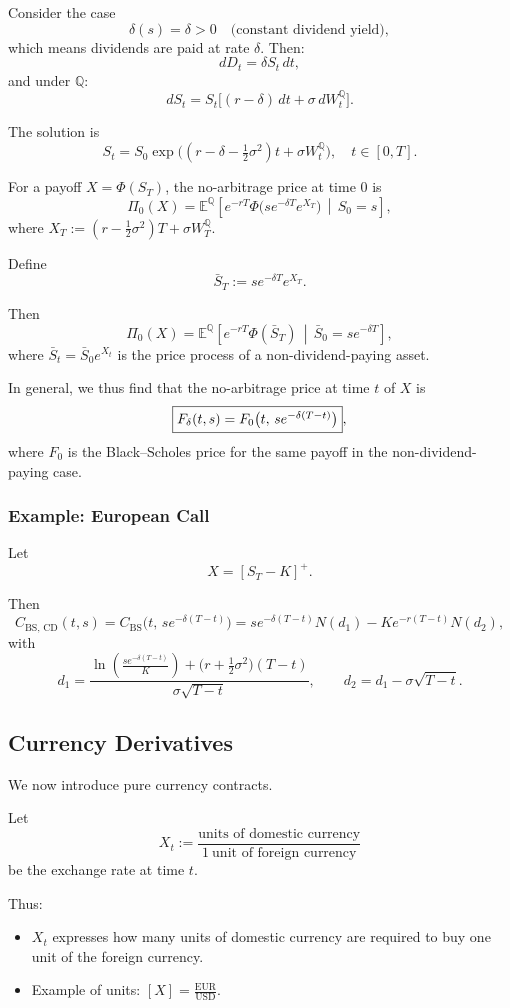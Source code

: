 \documentclass[12pt,a4paper]{article}
\theoremstyle{definition}
\begin{document}
Consider the case
\[
\delta(s) = \delta > 0 \quad \text{(constant dividend yield)},
\]
which means dividends are paid at rate $\delta$. Then:
\[
dD_t = \delta S_t\, dt,
\]
and under $\mathbb{Q}$:
\[
dS_t = S_t\big[(r - \delta)\, dt + \sigma\, dW_t^\mathbb{Q}\big].
\]

The solution is
\[
S_t = S_0 \exp\Big((r - \delta - \tfrac{1}{2}\sigma^2)t + \sigma W_t^\mathbb{Q}\Big), \quad t \in [0, T].
\]

For a payoff $X = \Phi(S_T)$, the no-arbitrage price at time 0 is
\[
\Pi_0(X) = \mathbb{E}^\mathbb{Q}\left[e^{-rT}\Phi\big(s e^{-\delta T} e^{X_T}\big)\,\middle|\, S_0 = s\right],
\]
where $X_T := (r - \tfrac{1}{2}\sigma^2)T + \sigma W_T^\mathbb{Q}$.

Define
\[
\bar{S}_T := s e^{-\delta T} e^{X_T}.
\]

Then
\[
\Pi_0(X) = \mathbb{E}^\mathbb{Q}\left[e^{-rT}\Phi(\bar{S}_T)\,\middle|\,\bar{S}_0 = s e^{-\delta T}\right],
\]
where $\bar{S}_t = \bar{S}_0 e^{X_t}$ is the price process of a non-dividend-paying asset.

In general, we thus find that the no-arbitrage price at time $t$ of $X$ is
\[
\fbox{$F_\delta(t, s) = F_0\big(t,\, s e^{-\delta (T-t)}\big)$},
\]
where $F_0$ is the Black--Scholes price for the same payoff in the non-dividend-paying case.

\subsubsection{Example: European Call}

Let
\[
X = [S_T - K]^+.
\]

Then
\[
C_{\text{BS, CD}}(t, s) = C_{\text{BS}}\big(t,\, s e^{-\delta (T-t)}\big) = s e^{-\delta (T-t)} N(d_1) - K e^{-r(T-t)} N(d_2),
\]
with
\[
d_1 = \frac{\ln\!\left(\frac{s e^{-\delta (T-t)}}{K}\right) + \big(r + \tfrac{1}{2}\sigma^2\big)(T-t)}{\sigma\sqrt{T-t}}, \qquad d_2 = d_1 - \sigma\sqrt{T-t}.
\]

\subsection{Currency Derivatives}

We now introduce pure currency contracts.

Let
\[
X_t := \frac{\text{units of domestic currency}}{1\ \text{unit of foreign currency}}
\]
be the exchange rate at time $t$.

Thus:
\begin{itemize}
\item $X_t$ expresses how many units of domestic currency are required to buy one unit of the foreign currency.
\item Example of units: $[X] = \frac{\text{EUR}}{\text{USD}}$.
\end{itemize}
\end{document}

